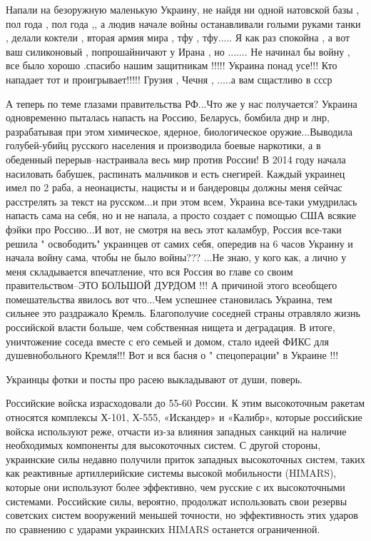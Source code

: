 Напали на безоружную маленькую Украину, не найдя ни одной натовской базы , пол
года , пол года ,, а людив начале войны останавливали голыми руками танки ,
делали коктели , вторая армия мира , тфу , тфу..... Я как раз спокойна , а вот
ваш силиконовый , попрошайничают у Ирана , но ....... Не начинал бы войну , все
было хорошо .спасибо нашим защитникам !!!!! Украина понад усе!!! Кто нападает
тот и проигрывает!!!!! Грузия , Чечня , .....а вам сщастливо в ссср

А теперь по теме глазами правительства РФ...Что же у нас получается? Украина
одновременно пыталась напасть на Россию, Беларусь, бомбила днр и лнр,
разрабатывая при этом химическое, ядерное, биологическое оружие...Выводила
голубей-убийц русского населения и производила боевые наркотики, а в обеденный
перерыв--настраивала весь мир против России! В 2014 году начала насиловать
бабушек, распинать мальчиков и есть снегирей. Каждый украинец имел по 2 раба, а
неонацисты, нацисты и и бандеровцы должны меня сейчас расстрелять за текст на
русском...и при этом всем, Украина все-таки умудрилась напасть сама на себя, но
и не напала, а просто создает с помощью США всякие фэйки про Россию...И вот, не
смотря на весь этот каламбур, Россия все-таки решила " освободить" украинцев от
самих себя, опередив на 6 часов Украину и начала войну сама, чтобы не было
войны??? ...Не знаю, у кого как, а лично у меня складывается впечатление, что
вся Россия во главе со своим правительством--ЭТО БОЛЬШОЙ ДУРДОМ !!! А причиной
этого всеобщего помешательства явилось вот что...Чем успешнее становилась
Украина, тем сильнее это раздражало Кремль. Благополучие соседней страны
отравляло жизнь российской власти больше, чем собственная нищета и деградация.
В итоге, уничтожение соседа вместе с его семьей и домом, стало идеей ФИКС для
душевнобольного Кремля!!! Вот и вся басня о " спецоперации" в Украине !!!

Украинцы фотки и посты про расею выкладывают от души, поверь.

Российские войска израсходовали до 55-60%
России. К этим высокоточным ракетам относятся комплексы Х-101, Х-555,
«Искандер» и «Калибр», которые российские войска используют реже, отчасти из-за
влияния западных санкций на наличие необходимых компоненты для высокоточных
систем. С другой стороны, украинские силы недавно получили приток западных
высокоточных систем, таких как реактивные артиллерийские системы высокой
мобильности (HIMARS), которые они используют более эффективно, чем русские с их
высокоточными системами. Российские силы, вероятно, продолжат использовать свои
резервы советских систем вооружений меньшей точности, но эффективность этих
ударов по сравнению с ударами украинских HIMARS останется ограниченной.

